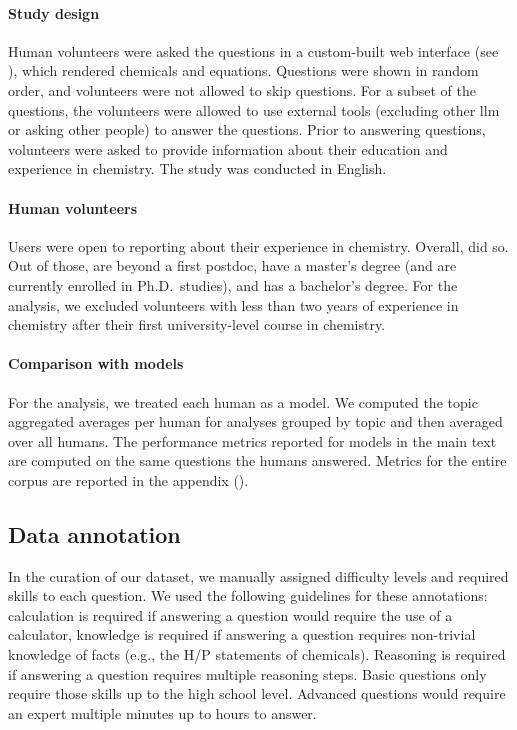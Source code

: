 \documentclass[11pt, oneside]{article}
\begin{document}
\begin{refsegment}
\paragraph{Study design}
Human volunteers were asked the questions in a custom-built web interface (see ), which rendered chemicals and equations. Questions were shown in random order, and volunteers were not allowed to skip questions. For a subset of the questions, the volunteers were allowed to use external tools (excluding other \gls{llm} or asking other people) to answer the questions. Prior to answering questions, volunteers were asked to provide information about their education and experience in chemistry. The study was conducted in English.

\paragraph{Human volunteers}
Users were open to reporting about their experience in chemistry.
Overall,  did so.
Out of those,  are beyond a first postdoc,  have a master's degree (and are currently enrolled in Ph.D.\ studies), and  has a bachelor's degree. For the analysis, we excluded volunteers with less than two years of experience in chemistry after their first university-level course in chemistry.


\paragraph{Comparison with models}
For the analysis, we treated each human as a model. We computed the topic aggregated averages per human for analyses grouped by topic and then averaged over all humans. The performance metrics reported for models in the main text are computed on the same questions the humans answered. Metrics for the entire corpus are reported in the appendix ().

\subsection{Data annotation}\label{sec:meth-topic}
In the curation of our dataset, we manually assigned difficulty levels and required skills to each question. We used the following guidelines for these annotations: calculation is required if answering a question would require the use of a calculator, knowledge is required if answering a question requires non-trivial knowledge of facts (e.g., the H/P statements of chemicals). Reasoning is required if answering a question requires multiple reasoning steps.
Basic questions only require those skills up to the high school level. Advanced questions would require an expert multiple minutes up to hours to answer.
\end{refsegment}
\printbibliography
\end{document}
